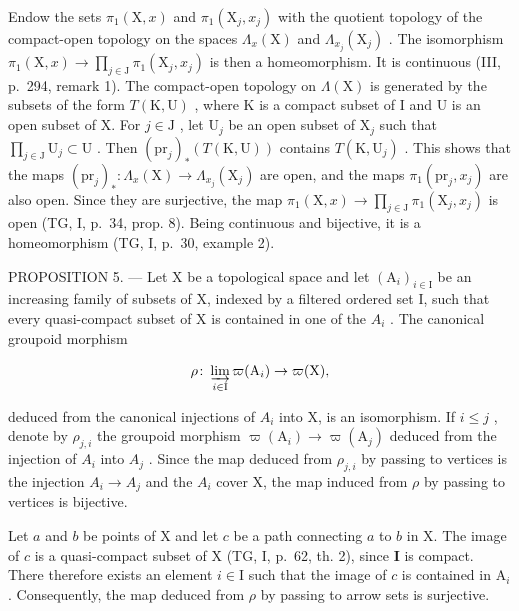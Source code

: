 Endow the sets \(\pi_1(\mathrm{X},x)\) and \(\pi_1(\mathrm{X}_j,x_j)\) with the quotient topology of the compact-open topology on the spaces \(\Lambda_x(\mathrm{X})\) and \(\Lambda_{x_j}(\mathrm{X}_j)\) . The isomorphism \(\pi_1(\mathrm{X},x)\to \prod_{j\in \mathrm{J}}\pi_1(\mathrm{X}_j,x_j)\) is then a homeomorphism. It is continuous (III, p.~294, remark 1). The compact-open topology on \(\Lambda (\mathrm{X})\) is generated by the subsets of the form \(T(\mathrm{K},\mathrm{U})\) , where K is a compact subset of I and U is an open subset of X. For \(j\in \mathrm{J}\) , let \(\mathrm{U}_j\) be an open subset of \(\mathrm{X}_j\) such that \(\prod_{j\in \mathrm{J}}\mathrm{U}_j\subset \mathrm{U}\) . Then \((\mathrm{pr}_j)_*(T(\mathrm{K},\mathrm{U}))\) contains \(T(\mathrm{K},\mathrm{U}_j)\) . This shows that the maps \((\mathrm{pr}_j)_*: \Lambda_x(\mathrm{X})\to \Lambda_{x_j}(\mathrm{X}_j)\) are open, and the maps \(\pi_1(\mathrm{pr}_j,x_j)\) are also open. Since they are surjective, the map \(\pi_1(\mathrm{X},x)\to \prod_{j\in \mathrm{J}}\pi_1(\mathrm{X}_j,x_j)\) is open (TG, I, p.~34, prop. 8). Being continuous and bijective, it is a homeomorphism (TG, I, p.~30, example 2).

PROPOSITION 5. — Let X be a topological space and let \((\mathrm{A}_{i})_{i\in\mathrm{I}}\) be an increasing family of subsets of X, indexed by a filtered ordered set I, such that every quasi-compact subset of X is contained in one of the \(A_{i}\) . The canonical groupoid morphism

\[
\rho \colon \varinjlim_ {i \in \mathrm{I}} \varpi (\mathrm{A} _ {i}) \to \varpi (\mathrm{X}),
\]

deduced from the canonical injections of \(A_{i}\) into X, is an isomorphism. If \(i \leqslant j\) , denote by \(\rho_{j,i}\) the groupoid morphism \(\varpi(\mathrm{A}_{i}) \to \varpi(\mathrm{A}_{j})\) deduced from the injection of \(A_{i}\) into \(A_{j}\) . Since the map deduced from \(\rho_{j,i}\) by passing to vertices is the injection \(A_{i} \to A_{j}\) and the \(A_{i}\) cover X, the map induced from \(\rho\) by passing to vertices is bijective.

Let \(a\) and \(b\) be points of X and let \(c\) be a path connecting \(a\) to \(b\) in X. The image of \(c\) is a quasi-compact subset of X (TG, I, p.~62, th. 2), since \(\mathbf{I}\) is compact. There therefore exists an element \(i \in \mathrm{I}\) such that the image of \(c\) is contained in \(\mathrm{A}_i\) . Consequently, the map deduced from \(\rho\) by passing to arrow sets is surjective.


